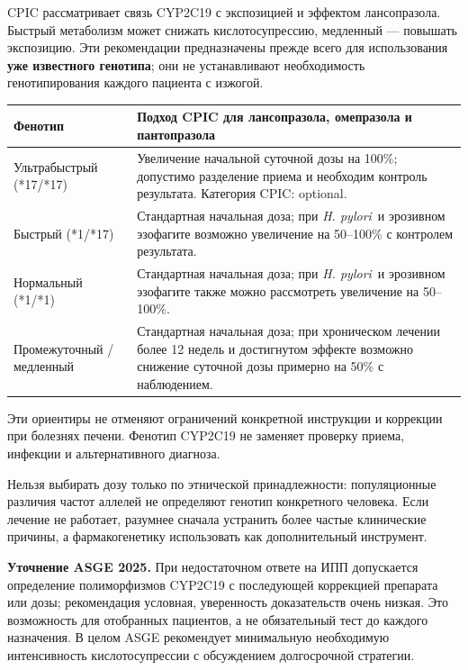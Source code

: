 \documentclass[11pt,a4paper,notitlepage]{report}
\newcommand{\Hp}{\textit{H. pylori}}
\newcommand{\src}[1]{\unskip\space\cite{#1}}
\begin{document}
CPIC рассматривает связь CYP2C19 с экспозицией и эффектом лансопразола. Быстрый метаболизм может снижать кислотосупрессию, медленный --- повышать экспозицию. Эти рекомендации предназначены прежде всего для использования \textbf{уже известного генотипа}; они не устанавливают необходимость генотипирования каждого пациента с изжогой.\src{cpic}

\begin{longtable}{P{0.27\textwidth}P{0.66\textwidth}}
\toprule
Фенотип & Подход CPIC для лансопразола, омепразола и пантопразола \\
\midrule
\endhead
Ультрабыстрый (*17/*17) & Увеличение начальной суточной дозы на 100\%; допустимо разделение приема и необходим контроль результата. Категория CPIC: optional. \\
Быстрый (*1/*17) & Стандартная начальная доза; при \Hp\ и эрозивном эзофагите возможно увеличение на 50--100\% с контролем результата. \\
Нормальный (*1/*1) & Стандартная начальная доза; при \Hp\ и эрозивном эзофагите также можно рассмотреть увеличение на 50--100\%. \\
Промежуточный / медленный & Стандартная начальная доза; при хроническом лечении более 12 недель и достигнутом эффекте возможно снижение суточной дозы примерно на 50\% с наблюдением. \\
\bottomrule
\end{longtable}
Эти ориентиры не отменяют ограничений конкретной инструкции и коррекции при болезнях печени. Фенотип CYP2C19 не заменяет проверку приема, инфекции и альтернативного диагноза.\src{cpic}

Нельзя выбирать дозу только по этнической принадлежности: популяционные различия частот аллелей не определяют генотип конкретного человека. Если лечение не работает, разумнее сначала устранить более частые клинические причины, а фармакогенетику использовать как дополнительный инструмент.\src{cpic,agagerd}

\textbf{Уточнение ASGE 2025.} При недостаточном ответе на ИПП допускается определение полиморфизмов CYP2C19 с последующей коррекцией препарата или дозы; рекомендация условная, уверенность доказательств очень низкая. Это возможность для отобранных пациентов, а не обязательный тест до каждого назначения. В целом ASGE рекомендует минимальную необходимую интенсивность кислотосупрессии с обсуждением долгосрочной стратегии.\src{asge2025}
\end{document}
